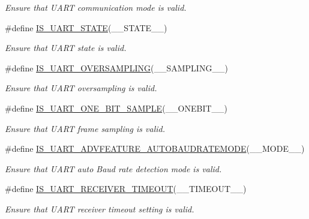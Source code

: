 \begin{DoxyCompactItemize}
\begin{DoxyCompactList}\small\item\em Ensure that U\+A\+RT communication mode is valid. \end{DoxyCompactList}\item 
\#define \mbox{\hyperlink{group___u_a_r_t___private___macros_ga754855879401ab846803a03eec2f7f10}{I\+S\+\_\+\+U\+A\+R\+T\+\_\+\+S\+T\+A\+TE}}(\+\_\+\+\_\+\+S\+T\+A\+T\+E\+\_\+\+\_\+)
\begin{DoxyCompactList}\small\item\em Ensure that U\+A\+RT state is valid. \end{DoxyCompactList}\item 
\#define \mbox{\hyperlink{group___u_a_r_t___private___macros_ga8d918253e015c4a8aa07316a89f8265e}{I\+S\+\_\+\+U\+A\+R\+T\+\_\+\+O\+V\+E\+R\+S\+A\+M\+P\+L\+I\+NG}}(\+\_\+\+\_\+\+S\+A\+M\+P\+L\+I\+N\+G\+\_\+\+\_\+)
\begin{DoxyCompactList}\small\item\em Ensure that U\+A\+RT oversampling is valid. \end{DoxyCompactList}\item 
\#define \mbox{\hyperlink{group___u_a_r_t___private___macros_ga6452a4420dac4abd4f0ea0e1677f37a9}{I\+S\+\_\+\+U\+A\+R\+T\+\_\+\+O\+N\+E\+\_\+\+B\+I\+T\+\_\+\+S\+A\+M\+P\+LE}}(\+\_\+\+\_\+\+O\+N\+E\+B\+I\+T\+\_\+\+\_\+)
\begin{DoxyCompactList}\small\item\em Ensure that U\+A\+RT frame sampling is valid. \end{DoxyCompactList}\item 
\#define \mbox{\hyperlink{group___u_a_r_t___private___macros_ga88f07bdfe1fcdff17edbbba2f196110d}{I\+S\+\_\+\+U\+A\+R\+T\+\_\+\+A\+D\+V\+F\+E\+A\+T\+U\+R\+E\+\_\+\+A\+U\+T\+O\+B\+A\+U\+D\+R\+A\+T\+E\+M\+O\+DE}}(\+\_\+\+\_\+\+M\+O\+D\+E\+\_\+\+\_\+)
\begin{DoxyCompactList}\small\item\em Ensure that U\+A\+RT auto Baud rate detection mode is valid. \end{DoxyCompactList}\item 
\#define \mbox{\hyperlink{group___u_a_r_t___private___macros_gaa2ad21da17caf46375c7bd4efbde8b17}{I\+S\+\_\+\+U\+A\+R\+T\+\_\+\+R\+E\+C\+E\+I\+V\+E\+R\+\_\+\+T\+I\+M\+E\+O\+UT}}(\+\_\+\+\_\+\+T\+I\+M\+E\+O\+U\+T\+\_\+\+\_\+)
\begin{DoxyCompactList}\small\item\em Ensure that U\+A\+RT receiver timeout setting is valid. \end{DoxyCompactList}\item 

\end{DoxyCompactItemize}
